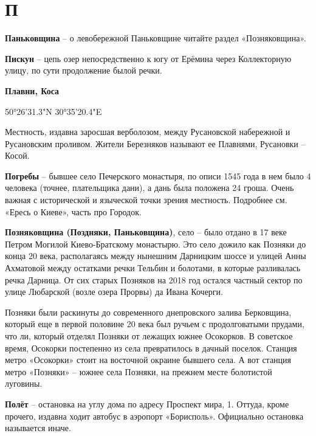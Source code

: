 \chapter*{П}

\textbf{Паньковщина} – о левобережной Паньковщине читайте раздел «Позняковщина».\\

\medskip

\textbf{Пискун} – цепь озер непосредственно к югу от Ерёмина через Коллекторную улицу, по сути продолжение былой речки.\\

\medskip

\textbf{Плавни, Коса}

50°26'31.3"N 30°35'20.4"E

Местность, издавна заросшая верболозом, между Русановской набережной и Русановским проливом. Жители Березняков называют ее Плавнями, Русановки – Косой.\\

\medskip

\textbf{Погребы} – бывшее село Печерского монастыря, по описи 1545 года в нем было 4 человека (точнее, плательщика дани), а дань была положена 24 гроша. Очень важная с исторической и языческой точки зрения местность. Подробнее см. «Ересь о Киеве», часть про Городок.\\

\medskip

\textbf{Позняковщина (Поздняки, Паньковщина)}, село – было отдано в 17 веке Петром Могилой Киево-Братскому монастырю. Это село дожило как Позняки до конца 20 века, располагаясь между нынешним Дарницким шоссе и улицей Анны Ахматовой между остатками речки Тельбин и болотами, в которые разливалась речка Дарница. От сих старых Позняков на 2018 год остался частный сектор по улице Любарской (возле озера Прорвы) да Ивана Кочерги.

Позняки были раскинуты до современного днепровского залива Берковщина, который еще в первой половине 20 века был ручьем с продолговатыми прудами, что ли, который отделял Позняки от лежащих южнее Осокорков. В советское время, Осокорки постепенно из села превратилось в дачный поселок. Станция метро «Осокорки» стоит на восточной окраине бывшего села. А вот станция метро «Позняки» – южнее села Позняки, на прежнем месте болотистой луговины.\\

\medskip


\textbf{Полёт} – остановка на углу дома по адресу Проспект мира, 1. Оттуда, кроме прочего, издавна ходит автобус в аэропорт «Борисполь». Официально остановка называется иначе.\\ 

